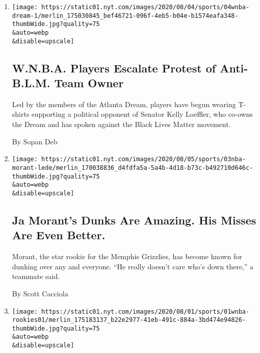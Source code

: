 \begin{enumerate}
\def\labelenumi{\arabic{enumi}.}
\item
  \href{/2020/08/04/sports/basketball/wnba-dream-loeffler-warnock.html}{}

  \texttt{[image: https://static01.nyt.com/images/2020/08/04/sports/04wnba-dream-1/merlin\_175030845\_bef46721-096f-4eb5-b04e-b1574eafa348-thumbWide.jpg?quality=75\\\&auto=webp\\\&disable=upscale]}

  \hypertarget{wnba-players-escalate-protest-of-anti-blm-team-owner}{%
  \subsection{W.N.B.A. Players Escalate Protest of Anti-B.L.M. Team
  Owner}\label{wnba-players-escalate-protest-of-anti-blm-team-owner}}

  Led by the members of the Atlanta Dream, players have begun wearing
  T-shirts supporting a political opponent of Senator Kelly Loeffler,
  who co-owns the Dream and has spoken against the Black Lives Matter
  movement.

  By Sopan Deb
\item
  \href{/2020/08/03/sports/basketball/ja-morant-grizzlies-dunks.html}{}

  \texttt{[image: https://static01.nyt.com/images/2020/08/05/sports/03nba-morant-lede/merlin\_170038836\_d4fdfa5a-5a4b-4d18-b73c-b492710d646c-thumbWide.jpg?quality=75\\\&auto=webp\\\&disable=upscale]}

  \hypertarget{ja-morants-dunks-are-amazing-his-misses-are-even-better}{%
  \subsection{Ja Morant's Dunks Are Amazing. His Misses Are Even
  Better.}\label{ja-morants-dunks-are-amazing-his-misses-are-even-better}}

  Morant, the star rookie for the Memphis Grizzlies, has become known
  for dunking over any and everyone. ``He really doesn't care who's down
  there,'' a teammate said.

  By Scott Cacciola
\item
  \href{/2020/08/01/sports/basketball/sabrina-ionescu-injury.html}{}

  \texttt{[image: https://static01.nyt.com/images/2020/08/01/sports/01wnba-rookies01/merlin\_175183137\_b22e2977-41eb-491c-884a-3bd474e94826-thumbWide.jpg?quality=75\\\&auto=webp\\\&disable=upscale]}


\end{enumerate}
